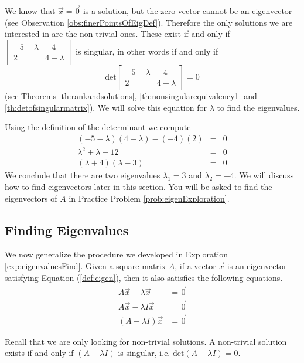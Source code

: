 \documentclass{ximera}
\begin{document}
\begin{exploration}
We know that $\vec{x}=\vec{0}$ is a solution, but the zero vector cannot be an eigenvector (see Observation \ref{obs:finerPointsOfEigDef}).  Therefore the only solutions we are interested in are the non-trivial ones.  These exist if and only  if $\begin{bmatrix}-5-\lambda & -4\\2&4-\lambda\end{bmatrix}$ is singular, in other words if and only if $$\mbox{det}\begin{bmatrix}-5-\lambda & -4\\2&4-\lambda\end{bmatrix}=0$$ (see Theorems \ref{th:rankandsolutions}, \ref{th:nonsingularequivalency1} and \ref{th:detofsingularmatrix}).  We will solve this equation for $\lambda$ to find the eigenvalues.

Using the definition of the determinant we compute
\begin{eqnarray*}
    (-5-\lambda)(4-\lambda)-(-4)(2)&=&0\\
    \lambda^2+\lambda-12&=&0\\
    (\lambda+4)(\lambda-3)&=&0
\end{eqnarray*}
We conclude that there are two eigenvalues $\lambda_1=3$ and $\lambda_2=-4$.
We will discuss how to find eigenvectors later in this section. You will be asked to find the eigenvectors of $A$ in Practice Problem \ref{prob:eigenExploration}.   
\end{exploration}

\subsection*{Finding Eigenvalues}
We now generalize the procedure we developed in Exploration \ref{exp:eigenvaluesFind}.  Given a square matrix $A$, if a vector $\vec{x}$ is an eigenvector satisfying Equation (\ref{def:eigen}), then it also satisfies the following equations.
\begin{align*}
A\vec{x}-\lambda \vec{x} &= \vec{0} \\
A\vec{x}-\lambda I\vec{x} &= \vec{0} \\
(A-\lambda I)\vec{x} &= \vec{0}
\end{align*}

Recall that we are only looking for non-trivial solutions.  A non-trivial solution exists if and only if $(A-\lambda I)$ is singular, i.e. $\mbox{det}(A-\lambda I) = 0$.

\end{document}
